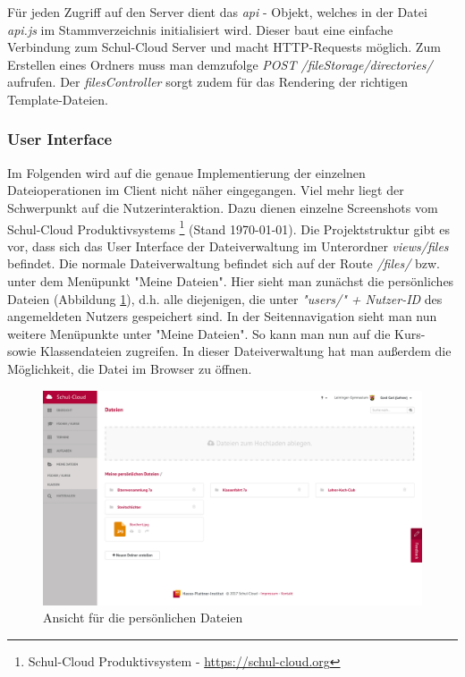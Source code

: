 Für jeden Zugriff auf den Server dient das \textit{api} - Objekt, welches in der Datei \textit{api.js} im Stammverzeichnis initialisiert wird. Dieser baut eine einfache Verbindung zum Schul-Cloud Server und macht HTTP-Requests möglich. Zum Erstellen eines Ordners muss man demzufolge \textit{POST /fileStorage/directories/} aufrufen. Der \textit{filesController} sorgt zudem für das Rendering der richtigen Template-Dateien.

\subsubsection{User Interface}
Im Folgenden wird auf die genaue Implementierung der einzelnen Dateioperationen im Client nicht näher eingegangen. Viel mehr liegt der Schwerpunkt auf die Nutzerinteraktion. Dazu dienen einzelne Screenshots vom Schul-Cloud Produktivsystems \footnote{Schul-Cloud Produktivsystem - \url{https://schul-cloud.org}} (Stand \today). Die Projektstruktur gibt es vor, dass sich das User Interface der Dateiverwaltung im Unterordner \textit{views/files} befindet. Die normale Dateiverwaltung befindet sich auf der Route \textit{/files/} bzw. unter dem Menüpunkt "Meine Dateien". Hier sieht man zunächst die persönliches Dateien (Abbildung \ref{fig:screenMeineDateien}), d.h. alle diejenigen, die unter \textit{"users/" + Nutzer-ID} des angemeldeten Nutzers gespeichert sind. In der Seitennavigation sieht man nun weitere Menüpunkte unter "Meine Dateien". So kann man nun auf die Kurs- sowie Klassendateien zugreifen. In dieser Dateiverwaltung hat man außerdem die Möglichkeit, die Datei im Browser zu öffnen.

\begin{figure}[H]
	\centering
	\includegraphics[width=1\linewidth]{images/screenMeineDateien}
	\caption[Caption for implementation]{Ansicht für die persönlichen Dateien}
	\label{fig:screenMeineDateien}
\end{figure}

